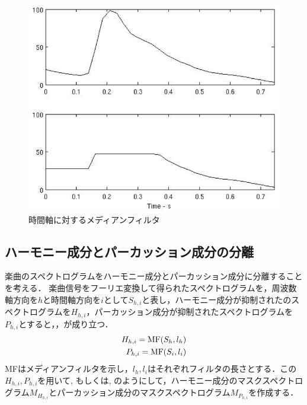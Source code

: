 \begin{figure}[htbp]
	\begin{center}
		\includegraphics[scale=0.363]{./images/old-study/median-time.png}
		\caption{時間軸に対するメディアンフィルタ}
		\label{fig:median-time}
	\end{center}
\end{figure}


\subsection{ハーモニー成分とパーカッション成分の分離}
楽曲のスペクトログラムをハーモニー成分とパーカッション成分に分離することを考える．
楽曲信号をフーリエ変換して得られたスペクトログラムを，周波数軸方向を$h$と時間軸方向を$i$として$S_{h,i}$と表し，ハーモニー成分が抑制されたのスペクトログラムを$H_{h, i}$，パーカッション成分が抑制されたスペクトログラムを$P_{h, i}$とすると，，が成り立つ．
\begin{eqnarray}
	H_{h, i} = {\rm MF} (S_h, l_h) \label{eq:har}\\
	P_{h, i} = {\rm MF} (S_i, l_i) \label{eq:per}
\end{eqnarray}
MFはメディアンフィルタを示し，$l_h, l_i$はそれぞれフィルタの長さとする．この$H_{h, i}, P_{h, i}$を用いて, もしくは, のようにして，ハーモニー成分のマスクスペクトログラム$M_{H_{h, i}}$とパーカッション成分のマスクスペクトログラム$M_{P_{h, i}}$を作成する．

